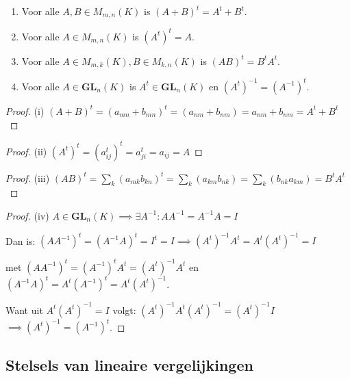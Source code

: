 \begin{lemma}[1.3.13]

    \begin{enumerate}
        \item[(i)] Voor alle $A, B \in M_{m,n}(K)$ is $(A + B)^t = A^t + B^t$.
        \item[(ii)] Voor alle $A \in M_{m,n}(K)$ is $(A^t)^t = A$.
        \item[(iii)] Voor alle $A \in M_{m,k}(K), B \in M_{k,n}(K)$ is $(AB)^t = B^t A^t$.
        \item[(iv)] Voor alle $A \in \mathbf{GL}_n(K)$ is $A^t \in \mathbf{GL}_n(K)$ en $(A^t)^{-1} = (A^{-1})^t$.
    \end{enumerate}
\end{lemma}
\begin{proof}(i)
    \(
        (A+B)^t 
        = (a_{mn} + b_{mn})^t
        = (a_{nm} + b_{nm})
        = a_{nm} + b_{nm}
        = A^t + B^t
    \)
\end{proof}
\begin{proof}(ii)
    \(
        (A^t)^t = (a_{ij}^t)^t = a_{ji}^t = a_{ij} = A
    \)
\end{proof}
\begin{proof}(iii)
    \(
        (AB)^t 
        = \sum_{k} (a_{mk}b_{kn})^t 
        = \sum_{k} (a_{km}b_{nk})
        = \sum_{k} (b_{nk}a_{km})
        = B^tA^t
    \)
\end{proof}
\begin{proof}(iv)
    \(A \in \mathbf{GL}_n(K) \implies \exists A^{-1}: AA^{-1} = A^{-1}A = I\)
    
    Dan is: \((AA^{-1})^t = (A^{-1}A)^t = I^t = I \implies (A^{t})^{-1} A^t = A^t(A^{t})^{-1} = I\)

    met \((AA^{-1})^t  = (A^{-1})^t A^t = (A^{t})^{-1} A^t\) en \((A^{-1}A)^t = A^t(A^{-1})^t = A^t(A^{t})^{-1}\).

    Want uit \(A^t(A^{t})^{-1} = I\) volgt: \((A^t)^{-1}A^t(A^{t})^{-1} = (A^t)^{-1}I\)
    \(\implies (A^t)^{-1} = (A^{-1})^t\).
\end{proof}


\subsection{Stelsels van lineaire vergelijkingen}

